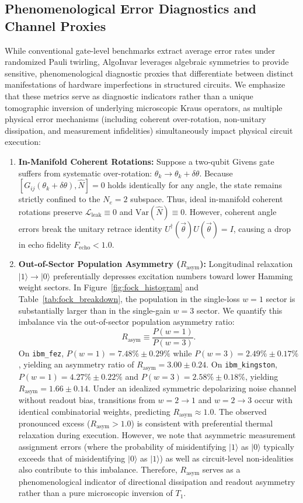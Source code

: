 \documentclass[aps,pra,reprint,superscriptaddress,floatfix,nofootinbib]{revtex4-2}
\begin{document}
\subsection{Phenomenological Error Diagnostics and Channel Proxies}
While conventional gate-level benchmarks extract average error rates under randomized Pauli twirling, AlgoInvar leverages algebraic symmetries to provide sensitive, phenomenological diagnostic proxies that differentiate between distinct manifestations of hardware imperfections in structured circuits. We emphasize that these metrics serve as diagnostic indicators rather than a unique tomographic inversion of underlying microscopic Kraus operators, as multiple physical error mechanisms (including coherent over-rotation, non-unitary dissipation, and measurement infidelities) simultaneously impact physical circuit execution:
\begin{enumerate}
    \item \textbf{In-Manifold Coherent Rotations:} Suppose a two-qubit Givens gate suffers from systematic over-rotation: $\theta_k \to \theta_k + \delta\theta$. Because $[G_{ij}(\theta_k + \delta\theta), \hat{N}] = 0$ holds identically for any angle, the state remains strictly confined to the $N_e = 2$ subspace. Thus, ideal in-manifold coherent rotations preserve $\mathcal{L}_{\text{leak}} \equiv 0$ and $\text{Var}(\hat{N}) \equiv 0$. However, coherent angle errors break the unitary retrace identity $U^\dagger(\vec{\theta}) U(\vec{\theta}) = I$, causing a drop in echo fidelity $F_{\text{echo}} < 1.0$.
    \item \textbf{Out-of-Sector Population Asymmetry ($R_{\text{asym}}$):} Longitudinal relaxation $|1\rangle \to |0\rangle$ preferentially depresses excitation numbers toward lower Hamming weight sectors. In Figure~\ref{fig:fock_histogram} and Table~\ref{tab:fock_breakdown}, the population in the single-loss $w = 1$ sector is substantially larger than in the single-gain $w = 3$ sector. We quantify this imbalance via the out-of-sector population asymmetry ratio:
    \begin{equation}
    R_{\text{asym}} \equiv \frac{P(w=1)}{P(w=3)}.
    \end{equation}
    On \texttt{ibm\_fez}, $P(w=1) = 7.48\% \pm 0.29\%$ while $P(w=3) = 2.49\% \pm 0.17\%$, yielding an asymmetry ratio of $R_{\text{asym}} = 3.00 \pm 0.24$. On \texttt{ibm\_kingston}, $P(w=1) = 4.27\% \pm 0.22\%$ and $P(w=3) = 2.58\% \pm 0.18\%$, yielding $R_{\text{asym}} = 1.66 \pm 0.14$. Under an idealized symmetric depolarizing noise channel without readout bias, transitions from $w = 2 \to 1$ and $w = 2 \to 3$ occur with identical combinatorial weights, predicting $R_{\text{asym}} \approx 1.0$. The observed pronounced excess ($R_{\text{asym}} > 1.0$) is consistent with preferential thermal relaxation during execution. However, we note that asymmetric measurement assignment errors (where the probability of misidentifying $|1\rangle$ as $|0\rangle$ typically exceeds that of misidentifying $|0\rangle$ as $|1\rangle$) as well as circuit-level non-idealities also contribute to this imbalance. Therefore, $R_{\text{asym}}$ serves as a phenomenological indicator of directional dissipation and readout asymmetry rather than a pure microscopic inversion of $T_1$.

\end{enumerate}
\end{document}

